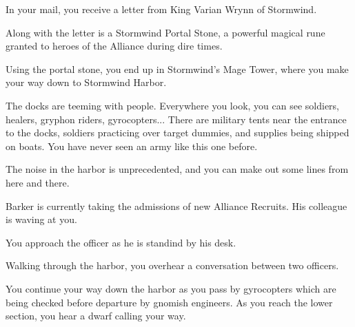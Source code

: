 In your mail, you receive a letter from King Varian Wrynn of Stormwind.


Along with the letter is a Stormwind Portal Stone, a powerful magical rune granted to heroes of the Alliance during dire times.

Using the portal stone, you end up in Stormwind's Mage Tower, where you make your way down to Stormwind Harbor.

The docks are teeming with people. Everywhere you look, you can see soldiers, healers, gryphon riders, gyrocopters... There are military tents near the entrance to the docks, soldiers practicing over target dummies, and supplies being shipped on boats. You have never seen an army like this one before.

The noise in the harbor is unprecedented, and you can make out some lines from here and there.



Barker is currently taking the admissions of new Alliance Recruits. His colleague is waving at you.


You approach the officer as he is standind by his desk.




Walking through the harbor, you overhear a conversation between two officers.



You continue your way down the harbor as you pass by gyrocopters which are being checked before departure by gnomish engineers. As you reach the lower section, you hear a dwarf calling your way.


